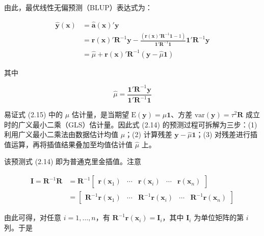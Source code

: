 \documentclass{ctexart}
\begin{document}
由此，最优线性无偏预测（BLUP）表达式为：

\begin{align*}
\widehat{\boldsymbol{y}}(\boldsymbol{x})&=\widehat{\boldsymbol{a}}(\boldsymbol{x})'\boldsymbol{y}\\
&=\boldsymbol{r}(\boldsymbol{x})'\boldsymbol{R}^{-1}\boldsymbol{y}-\frac{(\boldsymbol{r}(\boldsymbol{x})'\boldsymbol{R}^{-1}\boldsymbol{1}-1)}{\boldsymbol{1}'\boldsymbol{R}^{-1}\boldsymbol{1}}\boldsymbol{1}'\boldsymbol{R}^{-1}\boldsymbol{y}\\
&=\widehat{\mu}+\boldsymbol{r}(\boldsymbol{x})'\boldsymbol{R}^{-1}(\boldsymbol{y}-\widehat{\mu}\boldsymbol{1})
\tag{2.14}
\end{align*}

其中

\begin{equation*}
\widehat{\mu}=\frac{\boldsymbol{1}'\boldsymbol{R}^{-1}\boldsymbol{y}}{\boldsymbol{1}'\boldsymbol{R}^{-1}\boldsymbol{1}} 
\tag{2.15}
\end{equation*}

易证式 (2.15) 中的 $\mu$ 估计量，是当期望 $\mathrm{E}(\boldsymbol{y})=\mu\boldsymbol{1}$、方差 $\mathrm{var}(\boldsymbol{y})=\tau^2\boldsymbol{R}$ 成立时的广义最小二乘（GLS）估计量。因此式 (2.14) 的预测过程可拆解为三步：(1) 利用广义最小二乘法由数据估计均值 $\mu$；(2) 计算残差 $\boldsymbol{y}-\widehat{\mu}\boldsymbol{1}$；(3) 对残差进行插值运算，再将插值结果叠加至均值估计值 $\widehat{\mu}$ 上。


该预测式 (2.14) 即为普通克里金插值。注意

\begin{align*}
\boldsymbol{I}=\boldsymbol{R}^{-1}\boldsymbol{R}&=\boldsymbol{R}^{-1}
\begin{bmatrix}
\boldsymbol{r}(\boldsymbol{x}_{1})&\cdots&\boldsymbol{r}(\boldsymbol{x}_{i})&\cdots&\boldsymbol{r}(\boldsymbol{x}_{n})
\end{bmatrix}\\&=\begin{bmatrix}
\boldsymbol{R}^{-1}\boldsymbol{r}(\boldsymbol{x}_{1})&\cdots&\boldsymbol{R}^{-1}\boldsymbol{r}(\boldsymbol{x}_{i})&\cdots&\boldsymbol{R}^{-1}\boldsymbol{r}(\boldsymbol{x}_{n})
\end{bmatrix}
\end{align*}

由此可得，对任意 $i=1,\dots,n$，有 $\boldsymbol{R}^{-1}\boldsymbol{r}(\boldsymbol{x}_i)=\boldsymbol{I}_i$，其中 $\boldsymbol{I}_i$ 为单位矩阵的第 $i$ 列。于是
\end{document}
